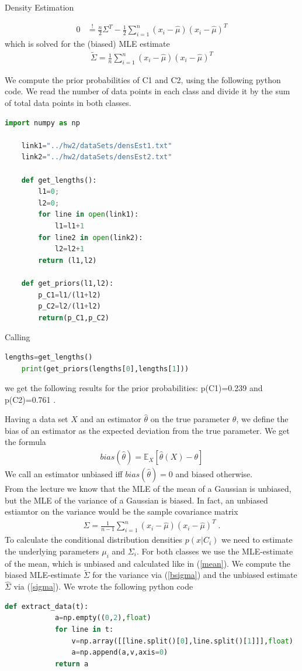 \documentclass[
ngerman,
]{tudaexercise}
\newcommand{\sni}{\sum_{i=1}^{n}}
\begin{document}
\begin{task}{Density Estimation}
\begin{subtask}
\begin{align*}
			0&\stackrel{!}{=}\frac{n}{2}\Sigma^T-\frac{1}{2}\sni(x_i-\hat{\mu})(x_i-\hat{\mu})^T
		\end{align*}
		which is solved for the (biased) MLE estimate
		\begin{align}\label{bsigma}
			\tilde{\Sigma}=\frac{1}{n}\sni (x_i-\hat{\mu})(x_i-\hat{\mu})^T
		\end{align}
		\end{subtask}
	\begin{subtask}
		We compute the prior probabilities of C1 and C2, using the following python code. We read the number of data points in each class and divide it by the sum of total data points in both classes.
		\begin{lstlisting}[language=Python]
	import numpy as np
	
	link1="../hw2/dataSets/densEst1.txt"
	link2="../hw2/dataSets/densEst2.txt"
	
	def get_lengths():
		l1=0;
		l2=0;
		for line in open(link1):
			l1=l1+1
		for line2 in open(link2):
			l2=l2+1
		return (l1,l2)    
	
	def get_priors(l1,l2):
		p_C1=l1/(l1+l2)
		p_C2=l2/(l1+l2)
		return(p_C1,p_C2)
		\end{lstlisting}
		Calling
		\begin{lstlisting}[language=Python]
	lengths=get_lengths()
	print(get_priors(lengths[0],lengths[1]))
		\end{lstlisting}
		we get the following results for the prior probabilities: p(C1)=0.239 and p(C2)=0.761 .
		\end{subtask}
	\begin{subtask}
		Having a data set $X$ and an estimator $\hat{\theta}$ on the true parameter $\theta$, we define the bias of an estimator as the expected deviation from the true parameter. We get the formula\begin{align*}bias(\hat{\theta})=\mathbb{E}_X\left[ \hat{\theta}(X)-\theta\right] 
		\end{align*} We call an estimator unbiased iff $bias(\hat{\theta})=0$ and biased otherwise.\\From the lecture we know that the MLE of the mean of a Gaussian is unbiased, but the MLE of the variance of a Gaussian is biased. In fact, an unbiased estiamtor on the variance would be the sample covariance matrix \begin{align}\label{sigma}
\hat{\Sigma}=\frac{1}{n-1}\sni(x_i-\hat{\mu})(x_i-\hat{\mu})^T \;.
		\end{align}
		To calculate the conditional distribution densities $p(x|C_i)$ we need to estimate the underlying parameters $\mu_i$ and $\Sigma_i$. For both classes we use the MLE-estimate of the mean, which is unbiased and calculated like in (\ref{mean}). We compute the biased MLE-estimate $\tilde{\Sigma}$ for the variance via (\ref{bsigma}) and the unbiased estimate $\hat{\Sigma}$ via (\ref{sigma}). We wrote the following python code
		\begin{lstlisting}[language=Python]
		def extract_data(t):
			a=np.empty((0,2),float)
			for line in t:
				v=np.array([[line.split()[0],line.split()[1]]],float)
				a=np.append(a,v,axis=0)
			return a
		

\end{lstlisting}
\end{subtask}
\end{task}
\end{document}
